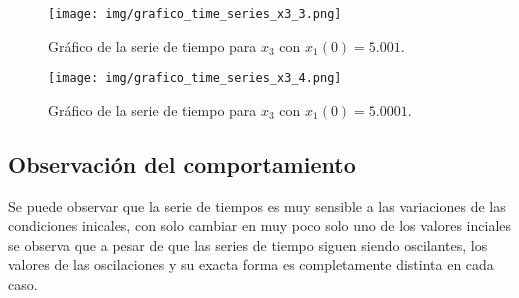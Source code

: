 
\begin{figure}[!h] %
\begin{center}
\texttt{[image: img/grafico\_time\_series\_x3\_3.png]} %
\caption{\label{fig:fig_ts_x3_iv3}\footnotesize{Gráfico de la serie de tiempo para $x_{3}$ con $x_{1}(0) = 5.001$.}}
\end{center}
\end{figure}


\begin{figure}[!h] %
\begin{center}
\texttt{[image: img/grafico\_time\_series\_x3\_4.png]} %
\caption{\label{fig:fig_ts_x3_iv4}\footnotesize{Gráfico de la serie de tiempo para $x_{3}$ con $x_{1}(0) = 5.0001$.}}
\end{center}
\end{figure}

\clearpage


\subsection{Observación del comportamiento}

Se puede observar que la serie de tiempos es muy sensible a las variaciones de las condiciones inicales, con solo cambiar en muy poco solo uno de los valores inciales se observa que a pesar de que las series de tiempo siguen siendo oscilantes, los valores de las oscilaciones y  su exacta forma es completamente distinta en cada caso.